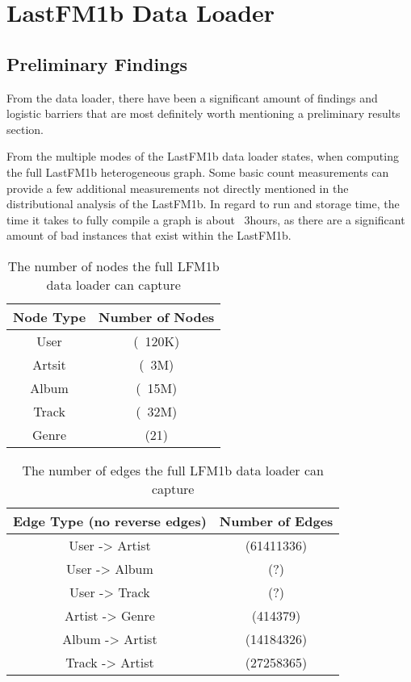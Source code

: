 \section{LastFM1b Data Loader}

\subsection{Preliminary Findings}

From the data loader, there have been a significant amount of findings and logistic barriers that are most definitely worth mentioning a preliminary results section.

From the multiple modes of the LastFM1b data loader states, when computing the full LastFM1b heterogeneous graph. Some basic count measurements can provide a few additional measurements not directly mentioned in the distributional analysis of the LastFM1b. In regard to run and storage time, the time it takes to fully compile a graph is about ~3hours, as there are a significant amount of bad instances that exist within the LastFM1b. 

\begin{table}[!ht]
\renewcommand{\arraystretch}{1.50}
\caption{The number of nodes the full LFM1b data loader can capture}
\label{tablePCA}
\centering
\begin{tabular}{| c | c |}
\hline
\bfseries Node Type & \bfseries Number of Nodes \\
\hline\hline
User & (~120K)  \\
\hline
Artsit & (~3M)\\
\hline
Album & (~15M)  \\
\hline
Track & (~32M)  \\
\hline
Genre & (21)  \\
\hline
\end{tabular}
\end{table}

\begin{table}[!ht]
\renewcommand{\arraystretch}{1.50}
\caption{The number of edges the full LFM1b data loader can capture}
\label{tablePCA}
\centering
\begin{tabular}{| c | c |}
\hline
\bfseries Edge Type (no reverse edges) & \bfseries Number of Edges \\
\hline\hline
User -> Artist & (61411336)  \\
\hline
User -> Album & (?)\\
\hline
User -> Track & (?)  \\
\hline
Artist -> Genre & (414379)  \\
\hline
Album -> Artist & (14184326)  \\
\hline
Track -> Artist & (27258365)  \\
\hline
\end{tabular}
\end{table}

